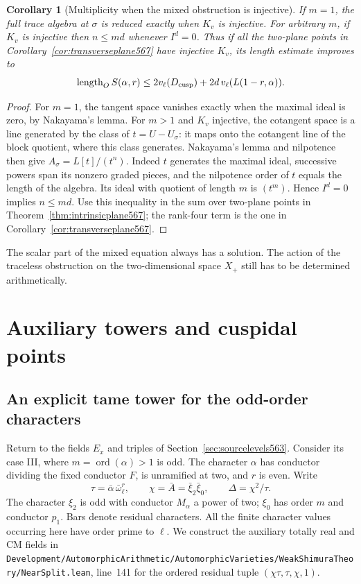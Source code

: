 \documentclass[a4paper,11pt]{article}
\newtheorem{corollary}[proposition]{Corollary}
\theoremstyle{definition}
\theoremstyle{remark}
\newcommand{\srcloc}[2]{{\small\nolinkurl{#1.lean}}, line~#2}
\numberwithin{equation}{section}
\begin{document}
\begin{corollary}[Multiplicity when the mixed obstruction is injective]
\leavevmode\label{cor:mixedlength569}
If \(m=1\), the full trace algebra at \(\sigma\) is reduced
exactly when \(K_v\) is injective. For arbitrary \(m\), if
\(K_v\) is injective then \(n\le md\) whenever \(I^d=0\).
Thus if all the two-plane points in
Corollary~\ref{cor:transverseplane567} have injective \(K_v\),
its length estimate improves to
\[
  \operatorname{length}_O S(\alpha,r)
      \le 2v_\ell(D_{\rm cusp})+2d\,v_\ell(L(1-r,\alpha)).
\]
\end{corollary}
\begin{proof}
For \(m=1\), the tangent space vanishes exactly when the
maximal ideal is zero, by Nakayama's lemma. For \(m>1\)
and \(K_v\) injective, the cotangent space is a line
generated by the class of \(t=U-U_\sigma\): it maps onto
the cotangent line of the block quotient, where this class
generates. Nakayama's lemma and nilpotence then give
\(A_\sigma=L[t]/(t^n)\). Indeed \(t\) generates the
maximal ideal, successive powers span its nonzero graded
pieces, and the nilpotence order of \(t\) equals the
length of the algebra. Its ideal with quotient of length
\(m\) is \((t^m)\). Hence \(I^d=0\) implies \(n\le md\).
Use this inequality in the sum over two-plane points in
Theorem~\ref{thm:intrinsicplane567}; the rank-four term
is the one in Corollary~\ref{cor:transverseplane567}.
\end{proof}

The scalar part of the mixed equation always has a solution.
The action of the traceless obstruction on the two-dimensional
space \(X_+\) still has to be determined arithmetically.

\section{Auxiliary towers and cuspidal points}\label{nav:chapter-towers-cuspidal-points}

\subsection{An explicit tame tower for the odd-order characters}
\label{sec:tametower571}

Return to the fields \(E_x\) and triples of
Section~\ref{sec:sourcelevels563}. Consider its case III, where
\(m=\operatorname{ord}(\alpha)>1\) is odd. The character
\(\alpha\) has conductor dividing the fixed conductor \(F\),
is unramified at two, and \(r\) is even. Write
\[
   \tau=\bar\alpha\,\bar\omega_\ell^r,\qquad
   \chi=\bar A=\bar\xi_2\bar\xi_0,\qquad
   \Delta=\chi^2/\tau .
\]
The character \(\xi_2\) is odd with conductor \(M_\alpha\) a
power of two; \(\xi_0\) has order \(m\) and conductor \(p_1\).
Bars denote residual characters. All the finite character
values occurring here have order prime to \(\ell\). We
construct the auxiliary totally real and CM fields in
\srcloc{Development/AutomorphicArithmetic/AutomorphicVarieties/WeakShimuraTheory/NearSplit}{141}
for the ordered residual tuple \((\chi\tau,\tau,\chi,1)\).
\end{document}
